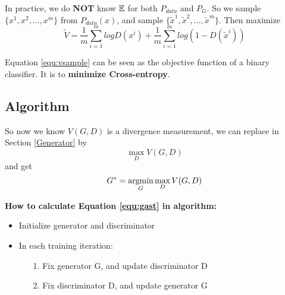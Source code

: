 \documentclass{../templates/ainote}
\begin{document}
In practice, we do \textbf{NOT} know $\mathbb{E}$ for both $P_{data}$ and $P_G$. So we sample $\{x^1, x^2, \ldots, x^m\}$ from $P_{data}(x)$, and sample $\{\widetilde{x}^1, \widetilde{x}^2, \ldots, \widetilde{x}^m\}$. Then maximize
\begin{equation}
\label{equ:vsample}
    \widetilde{V}=\frac{1}{m}\sum_{i=1}^m logD(x^i) + \frac{1}{m}\sum_{i=1}^m log(1-D(\widetilde{x}^i))
\end{equation}
\begin{note}
    Equation \ref{equ:vsample} can be seen as the objective function of a binary classifier. It is  to \textbf{minimize Cross-entropy}.
\end{note}

\subsection{Algorithm}
So now we know $V(G,D)$ is a divergence measurement, we can replace  in Section \ref{Generator} by $$\max_{D} V(G,D)$$ 
and get
\begin{equation}
\label{equ:gast}
    G^\ast = \operatorname*{argmin}_G\max_{D} V(G,D)
\end{equation}
\begin{info}
    \textbf{How to calculate {\normalfont Equation \ref{equ:gast}} in algorithm:}
    \begin{itemize}
        \item Initialize generator and discriminator
        \item In each training iteration:
            \begin{itemize}
                \item[1.] Fix generator G, and update discriminator D
                \item[2.] Fix discriminator D, and update generator G
            \end{itemize}
    \end{itemize}
    
\end{info}
\end{document}
